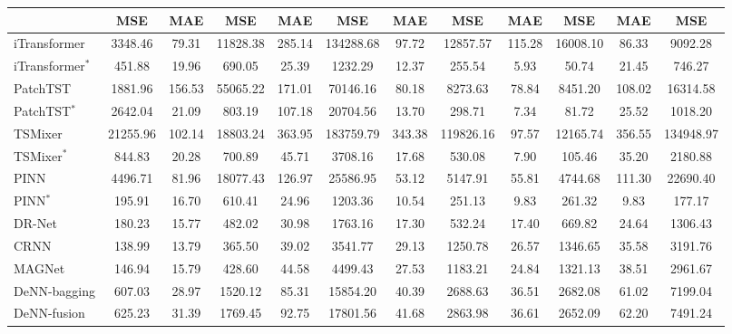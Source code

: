 \documentclass[lettersize,journal]{IEEEtran}
\begin{document}
\begin{table}[htbp]
{\begin{adjustbox}{center}
{\begin{threeparttable}
\begin{tabular}{lccccccccccc}
    \cmidrule{2-12}          & MSE   & MAE   & MSE   & MAE   & MSE   & MAE   & MSE   & MAE   & MSE   & MAE   & MSE \\
        \midrule
        iTransformer \cite{liu2024itransformer} & 3348.46  & 79.31  & 11828.38  & 285.14  & 134288.68  & 97.72  & 12857.57  & 115.28  & 16008.10  & 86.33  & 9092.28  \\
        iTransformer$^\ast$ \cite{liu2024itransformer} & 451.88  & 19.96  & 690.05  & 25.39  & 1232.29  & 12.37  & 255.54  & 5.93  & 50.74  & 21.45  & 746.27  \\
        PatchTST \cite{nie2023a} & 1881.96  & 156.53  & 55065.22  & 171.01  & 70146.16  & 80.18  & 8273.63  & 78.84  & 8451.20  & 108.02  & 16314.58  \\
        PatchTST$^\ast$ \cite{nie2023a} & 2642.04  & 21.09  & 803.19  & 107.18  & 20704.56  & 13.70  & 298.71  & 7.34  & 81.72  & 25.52  & 1018.20  \\
        TSMixer \cite{chen2023tsmixer} & 21255.96  & 102.14  & 18803.24  & 363.95  & 183759.79  & 343.38  & 119826.16  & 97.57  & 12165.74  & 356.55  & 134948.97  \\
        TSMixer$^\ast$ \cite{chen2023tsmixer} & 844.83  & 20.28  & 700.89  & 45.71  & 3708.16  & 17.68  & 530.08  & 7.90  & 105.46  & 35.20  & 2180.88  \\
        PINN \cite{wang2024physics}  & 4496.71  & 81.96  & 18077.43  & 126.97  & 25586.95  & 53.12  & 5147.91  & 55.81  & 4744.68  & 111.30  & 22690.40  \\
        PINN$^\ast$ \cite{wang2024physics} & 195.91  & 16.70  & 610.41  & 24.96  & 1203.36  & 10.54  & 251.13  & 9.83  & 261.32  & 9.83  & 177.17  \\
        DR-Net \cite{WANG2023108897} & 180.23  & 15.77  & 482.02  & 30.98  & 1763.16  & 17.30  & 532.24  & 17.40  & 669.82  & 24.64  & 1306.43  \\
        CRNN \cite{D2EE01676A}  & 138.99  & 13.79  & 365.50  & 39.02  & 3541.77  & 29.13  & 1250.78  & 26.57  & 1346.65  & 35.58  & 3191.76  \\
        MAGNet \cite{TAN2024103725} & 146.94  & 15.79  & 428.60  & 44.58  & 4499.43  & 27.53  & 1183.21  & 24.84  & 1321.13  & 38.51  & 2961.67  \\
        DeNN-bagging \cite{10102497} & 607.03  & 28.97  & 1520.12  & 85.31  & 15854.20  & 40.39  & 2688.63  & 36.51  & 2682.08  & 61.02  & 7199.04  \\
        DeNN-fusion \cite{10102497} & 625.23  & 31.39  & 1769.45  & 92.75  & 17801.56  & 41.68  & 2863.98  & 36.61  & 2652.09  & 62.20  & 7491.24  \\

\end{tabular}
\end{threeparttable}}
\end{adjustbox}}
\end{table}
\end{document}

